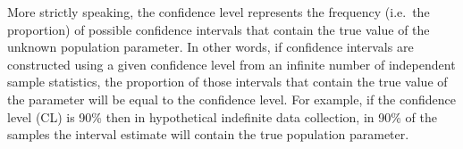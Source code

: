\begin{definition}
  \begin{remark}\label{rmk:Confidence_Interval_Stricter_Definition}
    More strictly speaking, the confidence level represents the frequency (i.e.\ the proportion) of possible confidence intervals that contain the true value of the unknown population parameter.
    In other words, if confidence intervals are constructed using a given confidence level from an infinite number of independent sample statistics, the proportion of those intervals that contain the true value of the parameter will be equal to the confidence level.
    For example, if the confidence level (CL) is 90\% then in hypothetical indefinite data collection, in 90\% of the samples the interval estimate will contain the true population parameter.
  \end{remark}
\end{definition}

